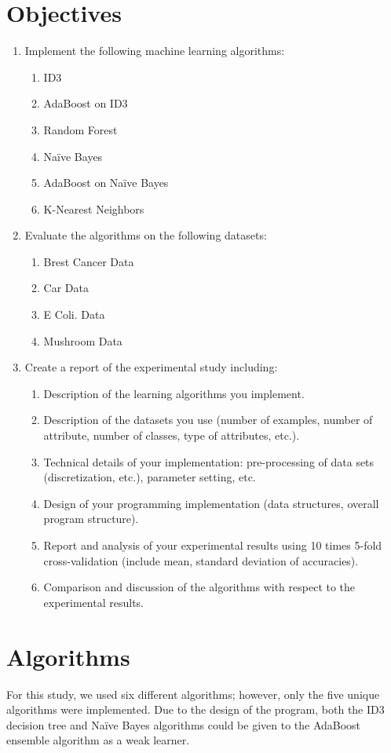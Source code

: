 \documentclass[11pt]{article}
\begin{document}
\section{Objectives}
\begin{enumerate}
  \item Implement the following machine learning algorithms:
  \begin{enumerate}
    \item ID3
    \item AdaBoost on ID3
    \item Random Forest
    \item Naïve Bayes
    \item AdaBoost on Naïve Bayes
    \item K-Nearest Neighbors
  \end{enumerate}
  \item Evaluate the algorithms on the following datasets:
  \begin{enumerate}
    \item Brest Cancer Data
    \item Car Data
    \item E Coli. Data
    \item Mushroom Data
  \end{enumerate}
  \item Create a report of the experimental study including:
  \begin{enumerate}
    \item Description of the learning algorithms you implement.
    \item Description of the datasets you use (number of examples, number of attribute, number of classes, type of attributes, etc.).
    \item Technical details of your implementation: pre-processing of data sets (discretization, etc.), parameter setting, etc.
    \item Design of your programming implementation (data structures, overall program structure).
    \item Report and analysis of your experimental results using 10 times 5-fold cross-validation (include mean, standard deviation of accuracies).
    \item Comparison and discussion of the algorithms with respect to the experimental results.
  \end{enumerate}
\end{enumerate}

\section{Algorithms}
For this study, we used six different algorithms; however, only the five unique algorithms were implemented. Due to the design of the program, both the ID3 decision tree and Naïve Bayes algorithms could be given to the AdaBoost ensemble algorithm as a weak learner.
\end{document}
